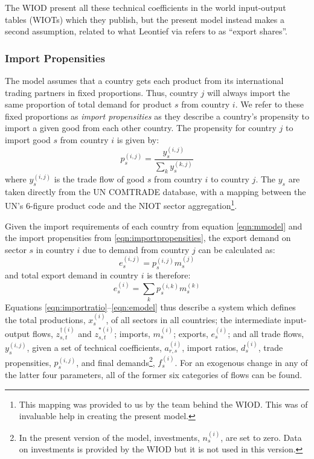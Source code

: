 \documentclass[a4paper]{article}
\begin{document}
The WIOD present all these technical coefficients in the world input-output tables (WIOTs) which they publish, but the present model instead makes a second assumption, related to what Leontief via \textcite{Duchin2004} refers to as ``export shares''.

\subsubsection*{Import Propensities}
The model assumes that a country gets each product from its international trading partners in fixed proportions.
Thus, country $j$ will always import the same proportion of total demand for product $s$ from country $i$.
We refer to these fixed proportions as \textit{import propensities} as they describe a country's propensity to import a given good from each other country.
The propensity for country $j$ to import good $s$ from country $i$ is given by:
\begin{equation}\label{eqn:importpropensities}
p^{(i,j)}_s = \frac{y^{(i,j)}_s}{\sum_k{y^{(k,j)}_s}}
\end{equation}
where $y^{(i,j)}_s$ is the trade flow of good $s$ from country $i$ to country $j$. The $y_s$ are taken directly from the UN COMTRADE database, with a mapping between the UN's 6-figure product code and the NIOT sector aggregation\footnote{This mapping was provided to us by the team behind the WIOD. This was of invaluable help in creating the present model.}.

Given the import requirements of each country from equation \eqref{eqn:mmodel} and the import propensities from \eqref{eqn:importpropensities}, the export demand on sector $s$ in country $i$ due to demand from country $j$ can be calculated as:
\begin{equation*}
e_s^{(i,j)} = p_s^{(i,j)}m_s^{(j)}
\end{equation*}
and total export demand in country $i$ is therefore:
\begin{equation}\label{eqn:emodel}
e_s^{(i)} = \sum_k{p_s^{(i,k)}m_s^{(k)}}
\end{equation}
\noindent Equations \eqref{eqn:importratio}--\eqref{eqn:emodel} thus describe a system which defines the total productions, $x_s^{(i)}$, of all sectors in all countries; the intermediate input-output flows, $z_{s,t}^{\dagger(i)}$ and $z_{s,t}^{*(i)}$; imports, $m_s^{(i)}$; exports, $e_s^{(i)}$; and all trade flows, $y_s^{(i,j)}$, given a set of technical coefficients, $a_{r,s}^{(i)}$, import ratios, $d_s^{(i)}$, trade propensities, $p_s^{(i,j)}$, and final demands\footnote{In the present version of the model, investments, $n_s^{(i)}$, are set to zero. 
Data on investments is provided by the WIOD but it is not used in this version.}, $f_s^{(i)}$. For an exogenous change in any of the latter four parameters, all of the former six categories of flows can be found.
\end{document}
